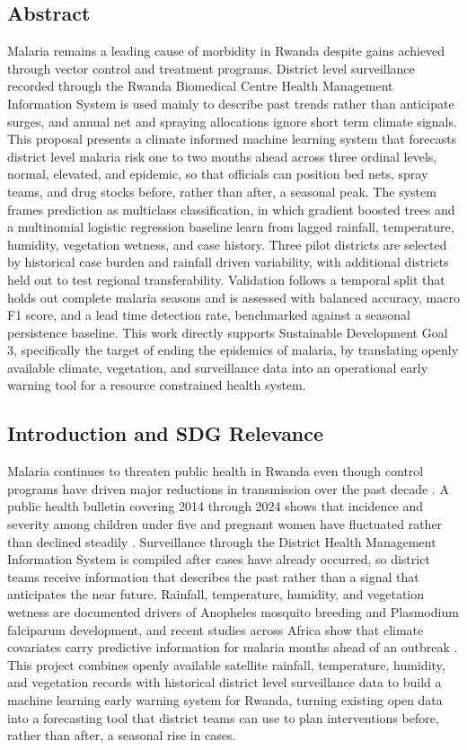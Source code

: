\documentclass[11pt]{article}
\begin{document}
\subsection*{Abstract}
Malaria remains a leading cause of morbidity in Rwanda despite gains achieved through vector control and treatment programs. District level surveillance recorded through the Rwanda Biomedical Centre Health Management Information System is used mainly to describe past trends rather than anticipate surges, and annual net and spraying allocations ignore short term climate signals. This proposal presents a climate informed machine learning system that forecasts district level malaria risk one to two months ahead across three ordinal levels, normal, elevated, and epidemic, so that officials can position bed nets, spray teams, and drug stocks before, rather than after, a seasonal peak. The system frames prediction as multiclass classification, in which gradient boosted trees and a multinomial logistic regression baseline learn from lagged rainfall, temperature, humidity, vegetation wetness, and case history. Three pilot districts are selected by historical case burden and rainfall driven variability, with additional districts held out to test regional transferability. Validation follows a temporal split that holds out complete malaria seasons and is assessed with balanced accuracy, macro F1 score, and a lead time detection rate, benchmarked against a seasonal persistence baseline. This work directly supports Sustainable Development Goal 3, specifically the target of ending the epidemics of malaria, by translating openly available climate, vegetation, and surveillance data into an operational early warning tool for a resource constrained health system.

\subsection{Introduction and SDG Relevance}
Malaria continues to threaten public health in Rwanda even though control programs have driven major reductions in transmission over the past decade \cite{mohrwanda2019}. A public health bulletin covering 2014 through 2024 shows that incidence and severity among children under five and pregnant women have fluctuated rather than declined steadily \cite{rbc2024}. Surveillance through the District Health Management Information System is compiled after cases have already occurred, so district teams receive information that describes the past rather than a signal that anticipates the near future. Rainfall, temperature, humidity, and vegetation wetness are documented drivers of Anopheles mosquito breeding and Plasmodium falciparum development, and recent studies across Africa show that climate covariates carry predictive information for malaria months ahead of an outbreak \cite{martineau2022,nkiruka2021,khan2024}. This project combines openly available satellite rainfall, temperature, humidity, and vegetation records with historical district level surveillance data to build a machine learning early warning system for Rwanda, turning existing open data into a forecasting tool that district teams can use to plan interventions before, rather than after, a seasonal rise in cases.
\end{document}
